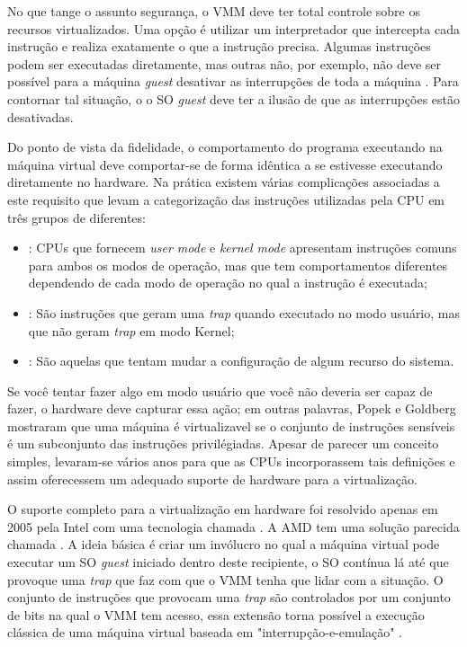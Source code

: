 No que tange o assunto segurança, o VMM deve ter total controle sobre os
recursos virtualizados. Uma opção é utilizar um interpretador que intercepta
cada instrução e realiza exatamente o que a instrução precisa. Algumas
instruções podem ser executadas diretamente, mas outras não, por exemplo, não
deve ser possível para a máquina \emph{guest} desativar as interrupções de toda
a máquina \citep{tanenbaum}. Para contornar tal situação, o o SO \emph{guest}
deve ter a ilusão de que as interrupções estão desativadas.

Do ponto de vista da fidelidade, o comportamento do programa executando na
máquina virtual deve comportar-se de forma idêntica a se estivesse executando
diretamente no hardware. Na prática existem várias complicações associadas a
este requisito que levam a categorização das instruções utilizadas pela CPU em
três grupos de diferentes:

\begin{itemize}
  \item {}: CPUs que fornecem \emph{user mode} e
        \emph{kernel mode} apresentam instruções comuns para ambos os modos de
        operação, mas que tem comportamentos diferentes dependendo de cada modo
        de operação no qual a instrução é executada;
  \item {}: São instruções que geram uma
        \emph{trap} quando executado no modo usuário, mas que não geram
        \emph{trap} em modo Kernel;
  \item {}: São aquelas que
        tentam mudar a configuração de algum recurso do sistema.
\end{itemize}

Se você tentar fazer algo em modo usuário que você não deveria ser capaz de
fazer, o hardware deve capturar essa ação; em outras palavras, Popek e Goldberg
mostraram que uma máquina é virtualizavel se o conjunto de instruções sensíveis
é um subconjunto das instruções privilégiadas. Apesar de parecer um conceito
simples, levaram-se vários anos para que as CPUs incorporassem tais definições
e assim oferecessem um adequado suporte de hardware para a virtualização.

O suporte completo para a virtualização em hardware foi resolvido apenas em
2005 pela Intel \citep{uhlig} com uma tecnologia chamada . A AMD tem uma solução parecida chamada . A ideia básica é criar um invólucro no qual a máquina
virtual pode executar um SO \emph{guest} iniciado dentro deste recipiente, o SO
contínua lá até que provoque uma \emph{trap} que faz com que o VMM tenha que
lidar com a situação. O conjunto de instruções que provocam uma \emph{trap} são
controlados por um conjunto de bits na qual o VMM tem acesso, essa extensão
torna possível a execução clássica de uma máquina virtual baseada em
"interrupção-e-emulação" \citep{tanenbaum}.

